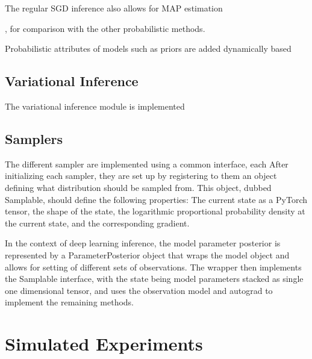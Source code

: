 The regular SGD inference also allows for MAP estimation

, for comparison with the other probabilistic methods.

Probabilistic attributes of models such as priors are added dynamically based

\subsection{Variational Inference}
The variational inference module is implemented


\subsection{Samplers}
The different sampler are implemented using a common interface, each 
After initializing each sampler, they are set up by registering to them an object defining what distribution should be sampled from. 
This object, dubbed Samplable, should define the following properties: The current state as a PyTorch tensor, the shape of the state, the logarithmic proportional probability density at the current state, and the corresponding gradient.  

In the context of deep learning inference, the model parameter posterior is represented by a ParameterPosterior object that wraps the model object and allows for setting of different sets of observations.
The wrapper then implements the Samplable interface, with the state being model parameters stacked as single one dimensional tensor, and uses the observation model and autograd to implement the remaining methods.


\section{Simulated Experiments}

